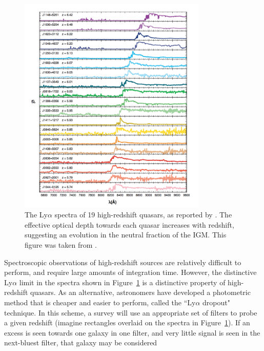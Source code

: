  \begin{figure}
 \centering
 \includegraphics[width=0.8\textwidth]{chapters/eor_intro/figures/FanSpectra.png}
 \caption[The Ly$\alpha$ spectra of 19 high-redshift quasars.]{The Ly$\alpha$ spectra of 19 high-redshift quasars, as reported by \cite{Fan.06.2}. The effective optical depth towards each quasar increases with redshift, suggesting an evolution in the neutral fraction of the IGM. This figure was taken from \cite{Fan.06.review}.}
 \label{fig:eor_intro_qso}
 \end{figure}

Spectroscopic observations of high-redshift sources are relatively difficult to perform, and require large amounts of integration time. However, the distinctive Ly$\alpha$ limit in the spectra shown in Figure~\ref{fig:eor_intro_qso} is a distinctive property of high-redshift quasars. As an alternative, astronomers have developed a photometric method that is cheaper and easier to perform, called the ``Ly$\alpha$ dropout" technique. In this scheme, a survey will use an appropriate set of filters to probe a given redshift (imagine rectangles overlaid on the spectra in Figure~\ref{fig:eor_intro_qso}). If an excess is seen towards one galaxy in one filter, and very little signal is seen in the next-bluest filter, that galaxy may be considered


